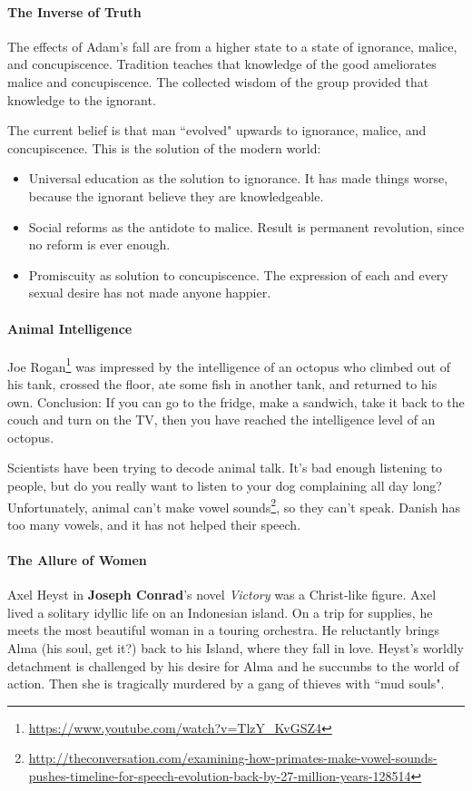 \paragraph{The Inverse of Truth}
The effects of Adam's fall are from a higher state to a state of ignorance, malice, and concupiscence. Tradition teaches that knowledge of the good ameliorates malice and concupiscence. The collected wisdom of the group provided that knowledge to the ignorant.

The current belief is that man ``evolved" upwards to ignorance, malice, and concupiscence. This is the solution of the modern world:

\begin{itemize}
\item Universal education as the solution to ignorance. It has made things worse, because the ignorant believe they are knowledgeable. 
\item Social reforms as the antidote to malice. Result is permanent revolution, since no reform is ever enough. 
\item Promiscuity as solution to concupiscence. The expression of each and every sexual desire has not made anyone happier. 
\end{itemize}
\paragraph{Animal Intelligence}
Joe Rogan\footnote{\url{https://www.youtube.com/watch?v=TlzY_KvGSZ4}} was impressed by the intelligence of an octopus who climbed out of his tank, crossed the floor, ate some fish in another tank, and returned to his own. Conclusion: If you can go to the fridge, make a sandwich, take it back to the couch and turn on the TV, then you have reached the intelligence level of an octopus.

Scientists have been trying to decode animal talk. It's bad enough listening to people, but do you really want to listen to your dog complaining all day long? Unfortunately, animal can't make vowel sounds\footnote{\url{http://theconversation.com/examining-how-primates-make-vowel-sounds-pushes-timeline-for-speech-evolution-back-by-27-million-years-128514}}, so they can't speak. Danish has too many vowels, and it has not helped their speech.

\paragraph{The Allure of Women}
Axel Heyst in \textbf{Joseph Conrad}'s novel \emph{Victory} was a Christ-like figure. Axel lived a solitary idyllic life on an Indonesian island. On a trip for supplies, he meets the most beautiful woman in a touring orchestra. He reluctantly brings Alma (his soul, get it?) back to his Island, where they fall in love. Heyst's worldly detachment is challenged by his desire for Alma and he succumbs to the world of action. Then she is tragically murdered by a gang of thieves with ``mud souls".


